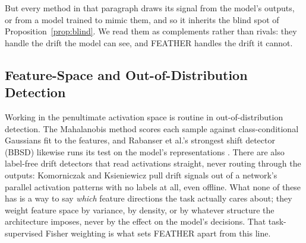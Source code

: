 \documentclass[graybox]{SNmult}
\begin{document}
But every method in that paragraph draws its signal from the model's outputs,
or from a model trained to mimic them, and so it inherits the blind spot of
Proposition~\ref{prop:blind}. We read them as complements rather than rivals:
they handle the drift the model can see, and FEATHER handles the drift it
cannot.

\subsection{Feature-Space and Out-of-Distribution Detection}

Working in the penultimate activation space is routine in out-of-distribution
detection. The Mahalanobis method \cite{lee2018mahalanobis} scores each
sample against class-conditional Gaussians fit to the features, and Rabanser
et al.'s strongest shift detector (BBSD) likewise runs its test on the
model's representations \cite{rabanser2019failing}. There are also label-free
drift detectors that read activations straight, never routing through the
outputs: Komorniczak and Ksieniewicz \cite{komorniczak2024parallel} pull
drift signals out of a network's parallel activation patterns with no labels
at all, even offline. What none of these has is a way to say \emph{which}
feature directions the task actually cares about; they weight feature space
by variance, by density, or by whatever structure the architecture imposes,
never by the effect on the model's decisions. That task-supervised Fisher
weighting is what sets FEATHER apart from this line.
\end{document}

